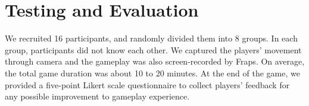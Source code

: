 \documentclass{chi-ext}
\begin{document}
\section{Testing and Evaluation}

We recruited 16 participants, and randomly divided them into 8 groups. In each group, participants did not know each other. We captured the players' movement through camera and the gameplay was also screen-recorded by Fraps\cite{Fraps}.
On average, the total game duration was about 10 to 20 minutes. 
At the end of the game, we provided a five-point Likert scale questionnaire to 
collect players' feedback for any possible improvement to gameplay experience.

\end{document}
